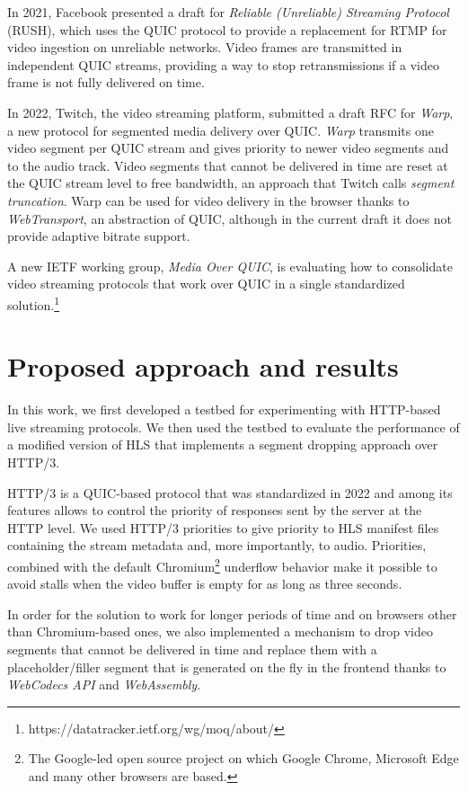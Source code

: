 In 2021, Facebook presented a draft for \textit{Reliable (Unreliable) Streaming Protocol} (RUSH), which uses the QUIC protocol to provide a replacement for RTMP for video ingestion on unreliable networks. Video frames are transmitted in independent QUIC streams, providing a way to stop retransmissions if a video frame is not fully delivered on time.\cite{rush}

In 2022, Twitch, the video streaming platform, submitted a draft RFC for \textit{Warp}, a new protocol for segmented media delivery over QUIC. \textit{Warp} transmits one video segment per QUIC stream and gives priority to newer video segments and to the audio track. Video segments that cannot be delivered in time are reset at the QUIC stream level to free bandwidth, an approach that Twitch calls \textit{segment truncation}. Warp can be used for video delivery in the browser thanks to \textit{WebTransport}, an abstraction of QUIC, although in the current draft it does not provide adaptive bitrate support.

A new IETF working group, \textit{Media Over QUIC}, is evaluating how to consolidate video streaming protocols that work over QUIC in a single standardized solution.\footnote{https://datatracker.ietf.org/wg/moq/about/}

\section{Proposed approach and results}
\label{sec:intro/proposal}

In this work, we first developed a testbed for experimenting with HTTP-based live streaming protocols. We then used the testbed to evaluate the performance of a modified version of HLS that implements a segment dropping approach over HTTP/3.

HTTP/3 is a QUIC-based protocol that was standardized in 2022 and among its features allows to control the priority of responses sent by the server at the HTTP level. We used HTTP/3 priorities to give priority to HLS manifest files containing the stream metadata and, more importantly, to audio. Priorities, combined with the default Chromium\footnote{The Google-led open source project on which Google Chrome, Microsoft Edge and many other browsers are based.} underflow behavior make it possible to avoid stalls when the video buffer is empty for as long as three seconds.

In order for the solution to work for longer periods of time and on browsers other than Chromium-based ones, we also implemented a mechanism to drop video segments that cannot be delivered in time and replace them with a placeholder/filler segment that is generated on the fly in the frontend thanks to \textit{WebCodecs API} and \textit{WebAssembly}.

